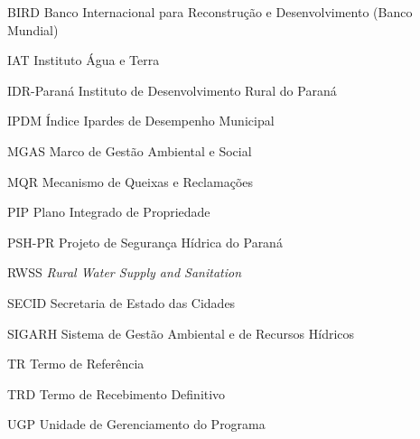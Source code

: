 

\frenchspacing

\pretextual
\imprimirfolhaderosto

\listoffigures*
\cleardoublepage

\listofquadros*
\cleardoublepage

\listoftables*
\cleardoublepage

\begin{siglas}
  \item[BIRD] Banco Internacional para Reconstrução e Desenvolvimento (Banco Mundial)
  \item[IAT] Instituto Água e Terra
  \item[IDR-Paraná] Instituto de Desenvolvimento Rural do Paraná
  \item[IPDM] Índice Ipardes de Desempenho Municipal
  \item[MGAS] Marco de Gestão Ambiental e Social
  \item[MQR] Mecanismo de Queixas e Reclamações
  \item[PIP] Plano Integrado de Propriedade
  \item[PSH-PR] Projeto de Segurança Hídrica do Paraná
  \item[RWSS] \textit{Rural Water Supply and Sanitation}
  \item[SECID] Secretaria de Estado das Cidades
  \item[SIGARH] Sistema de Gestão Ambiental e de Recursos Hídricos
  \item[TR] Termo de Referência
  \item[TRD] Termo de Recebimento Definitivo
  \item[UGP] Unidade de Gerenciamento do Programa
\end{siglas}

